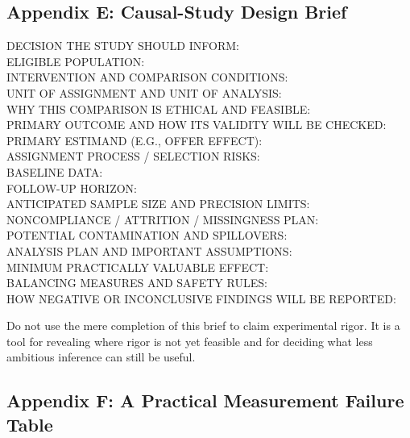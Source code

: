 \subsection*{Appendix E: Causal-Study Design Brief}

\begin{tcolorbox}[colback=white,colframe=BayesSecondary!40,arc=2pt,boxrule=0.6pt,title={\small\textbf{The Causal-Study Design Brief}}]
\footnotesize\ttfamily
DECISION THE STUDY SHOULD INFORM: \\
ELIGIBLE POPULATION: \\
INTERVENTION AND COMPARISON CONDITIONS: \\
UNIT OF ASSIGNMENT AND UNIT OF ANALYSIS: \\
WHY THIS COMPARISON IS ETHICAL AND FEASIBLE: \\
PRIMARY OUTCOME AND HOW ITS VALIDITY WILL BE CHECKED: \\
PRIMARY ESTIMAND (E.G., OFFER EFFECT): \\
ASSIGNMENT PROCESS / SELECTION RISKS: \\
BASELINE DATA: \\
FOLLOW-UP HORIZON: \\
ANTICIPATED SAMPLE SIZE AND PRECISION LIMITS: \\
NONCOMPLIANCE / ATTRITION / MISSINGNESS PLAN: \\
POTENTIAL CONTAMINATION AND SPILLOVERS: \\
ANALYSIS PLAN AND IMPORTANT ASSUMPTIONS: \\
MINIMUM PRACTICALLY VALUABLE EFFECT: \\
BALANCING MEASURES AND SAFETY RULES: \\
HOW NEGATIVE OR INCONCLUSIVE FINDINGS WILL BE REPORTED:
\end{tcolorbox}

Do not use the mere completion of this brief to claim experimental rigor. It is a tool for revealing where rigor is not yet feasible and for deciding what less ambitious inference can still be useful.

\subsection*{Appendix F: A Practical Measurement Failure Table}

